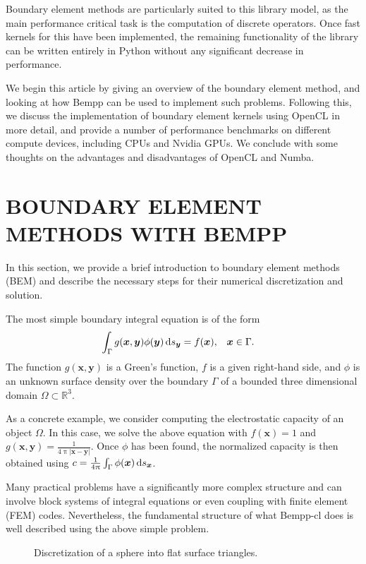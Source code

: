\documentclass{IEEEcsmag}
\newcommand{\bvec}[1]{\boldsymbol{#1}}
\def\bx{\bvec{x}}
\def\by{\bvec{y}}
\newcommand{\ds}[1][]{\,\mathrm{d}s\ifthenelse{\equal{#1}{}}{}{_{#1}}}
\begin{document}
Boundary element methods are particularly suited to this library model, as the main performance critical task is the computation of discrete operators. Once fast kernels for this have been implemented, the remaining functionality of the library can be written entirely in Python without any significant decrease in performance.

\bigskip

We begin this article by giving an overview of the boundary element method, and looking at how Bempp can be used to implement such problems. Following this, we discuss the implementation of boundary element kernels using OpenCL in more detail, and provide a number of performance benchmarks on different compute devices, including CPUs and Nvidia GPUs. We conclude with some thoughts on the advantages and disadvantages of OpenCL and Numba.


\section{BOUNDARY ELEMENT METHODS WITH BEMPP}
In this section, we provide a brief introduction to boundary element methods (BEM) and describe the necessary steps for their numerical discretization and solution.

The most simple boundary integral equation is of the form
\begin{align}
	\label{eq:bnd_integral}
	\int_{\Gamma} g(\bx, \by)\phi(\by)\ds[\by] &= f(\bx),&&\bx\in\Gamma.
\end{align}
The function $g(\bx, \by)$ is a Green's function, $f$ is a given right-hand side, and $\phi$ is an unknown surface density over the boundary $\Gamma$ of a bounded three dimensional domain $\Omega\subset\mathbb{R}^3$.

As a concrete example, we consider computing the electrostatic capacity of an object $\Omega$. In this case, we solve the above equation with $f(\bx)=1$ and $g(\bx,\by)=\frac{1}{4\uppi|\bx - \by|}$. Once $\phi$ has been found, the normalized capacity is then obtained using $c = \frac{1}{4\uppi}\int_{\Gamma}\phi(\bx)\ds[\bx]$.

Many practical problems have a significantly more complex structure and can involve block systems of integral equations or even coupling with finite element (FEM) codes. Nevertheless, the fundamental structure of what Bempp-cl does is well described using the above simple problem.

\begin{figure}
	\centering
	
	\caption{Discretization of a sphere into flat surface triangles.}
	\label{fig:triangulation}
\end{figure}
\end{document}
